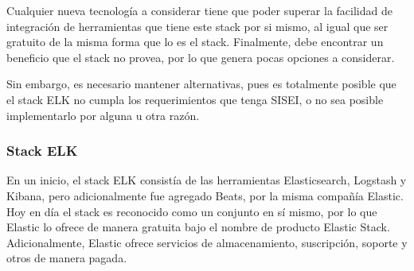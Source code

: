 Cualquier nueva tecnología a considerar tiene que poder superar la facilidad de integración de herramientas que tiene este stack por si mismo, al igual que ser gratuito de la misma forma que lo es el stack. Finalmente, debe encontrar un beneficio que el stack no provea, por lo que genera pocas opciones a considerar.

Sin embargo, es necesario mantener alternativas, pues es totalmente posible que el stack ELK no cumpla los requerimientos que tenga SISEI, o no sea posible implementarlo por alguna u otra razón.

\subsubsection{Stack ELK}
\label{sec:stack_elk}

En un inicio, el stack ELK consistía de las herramientas Elasticsearch, Logstash y Kibana, pero adicionalmente fue agregado Beats, por la misma compañía Elastic. Hoy en día el stack es reconocido como un conjunto en sí mismo, por lo que Elastic lo ofrece de manera gratuita bajo el nombre de producto Elastic Stack. Adicionalmente, Elastic ofrece servicios de almacenamiento, suscripción, soporte y otros de manera pagada.

